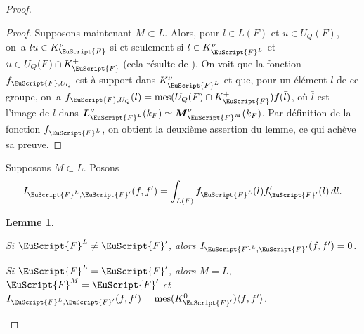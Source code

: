 \documentclass[JEP,XML,SOM,Unicode,francais]{cedram}
\let\mathcal \EuScript
\let\oldenumerate\enumerate
\renewcommand{\enumerate}{\oldenumerate\itemindent0pt}
\newenvironment{enumeratei}
{\bgroup\def\theenumi{\roman{enumi}}\def\theenumii{\arabic{enumii}}\oldenumerate}
{\endenumerate\egroup}
\let\<\langle
\let\>\rangle
\DeclareMathOperator{\mes}{mes}
\newcommand{\bL}{\boldsymbol{L}}
\newcommand{\bM}{\boldsymbol{M}}
\newcommand{\cF}{\mathcal{F}}
\theoremstyle{plain}
\newtheorem{lem}{Lemme}
\theoremstyle{definition}
\begin{document}
\begin{proof}
\begin{proof}
Supposons maintenant $M\subset L$. Alors, pour $l\in L(F)$ et $u\in U_{Q}(F)$, on~a $lu\in K_{\cF}^{\nu}$ si et seulement si $l\in K_{\cF^L}^{\nu}$ et $u\in U_{Q}(F)\cap K_{\cF}^+$ (cela résulte de \cite[Lem.\,6]{W2}). On voit que la fonction $f_{\cF,U_{Q}}$ est à support dans $K_{\cF^L}^{\nu}$ et que, pour un élément $l$ de ce groupe, on~a $f_{\cF,U_{Q}}(l)=\mes(U_{Q}(F)\cap K_{\cF}^+)f(\bar{l})$, où $\bar{l}$ est l'image de $l$ dans $\bL_{\cF^L}^{\nu}(k_{F})\simeq \bM_{\cF^M}^{\nu}(k_{F})$. Par définition de la fonction $f_{\cF^L}$, on obtient la deuxième assertion du lemme, ce qui achève sa preuve.
\end{proof}

Supposons $M\subset L$. Posons
\[
I_{\cF^L,\cF'}(f,f')=\int_{L(F)}f_{\cF^L}(l)f'_{\cF'}(l)\, dl.
\]

\skpt
\begin{lem}\label{lem2}
\begin{enumeratei}
\item\label{lem2i}
Si
$\cF^L\neq\cF'$, alors $I_{\cF^L,\cF'}(f,f')=0$.

\item\label{lem2ii}
Si $\cF^L=\cF'$, alors $M=L$, $\cF^M=\cF'$ et $I_{\cF^L,\cF'}(f,f')=\mes(K_{\cF'}^0)\<\bar{f},f'\>$.
\end{enumeratei}
\end{lem}


\end{proof}
\end{document}
